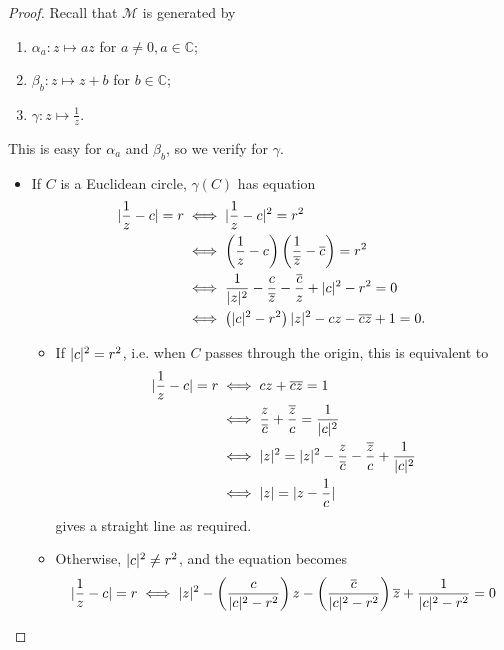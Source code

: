 \documentclass{article}
\theoremstyle{definition}
\theoremstyle{remark}
\DeclarePairedDelimiter{\abs}{\lvert}{\rvert}
\newcommand{\pqty}[1]{\left(#1\right)}
\newcommand{\functionmap}[3]{#1:#2\mapsto #3}
\newcommand{\conjugate}[1]{\overline{#1}}
\newcommand{\CC}{\mathbb{C}}
\newcommand{\mobius}{\mathcal{M}}
\begin{document}
\begin{proof}
    Recall that \(\mobius\) is generated by
    \begin{enumerate}
        \item \(\functionmap{\alpha_{a}}{z}{az}\) for \(a \neq 0, a \in \CC\);
        \item \(\functionmap{\beta_{b}}{z}{z + b}\) for \(b \in \CC\);
        \item \(\functionmap{\gamma}{z}{\frac{1}{z}}\).
    \end{enumerate}

    This is easy for \(\alpha_a\) and \(\beta_b\), so we verify for \(\gamma\).
    \begin{itemize}
        \item If \(C\) is a Euclidean circle, \(\gamma\pqty{C}\) has equation
        \begin{align*}
            \abs{\frac{1}{z} - c} = r &\iff \abs{\frac{1}{z} - c}^2 = r^2 \\
            &\iff \pqty{\frac{1}{z} - c} \pqty{\frac{1}{\conjugate{z}} - \conjugate{c}} = r^2 \\
            &\iff \frac{1}{\abs{z}^2} - \frac{c}{\conjugate{z}} - \frac{\conjugate{c}}{z} + \abs{c}^2 - r^2 = 0 \\
            &\iff \pqty{\abs{c}^2 - r^2} \abs{z}^2 - cz - \conjugate{c} \conjugate{z} + 1 = 0.
        \end{align*}
        \begin{itemize}
            \item If \(\abs{c}^2 = r^2\), i.e. when \(C\) passes through the origin, this is equivalent to
            \begin{align*}
                \abs{\frac{1}{z} - c} = r &\iff cz + \conjugate{c} \conjugate{z} = 1 \\
                &\iff \frac{z}{\conjugate{c}} + \frac{\conjugate{z}}{c} = \frac{1}{\abs{c}^2} \\
                &\iff \abs{z}^2 = \abs{z}^2 - \frac{z}{\conjugate{c}} - \frac{\conjugate{z}}{c} + \frac{1}{\abs{c}^2} \\
                &\iff \abs{z} = \abs{z - \frac{1}{c}}
            \end{align*}
            gives a straight line as required.
            \item Otherwise, \(\abs{c}^2 \neq r^2\), and the equation becomes
            \begin{align*}
                \abs{\frac{1}{z} - c} = r &\iff \abs{z}^2 - \pqty{\frac{c}{\abs{c}^2 - r^2}} z - \pqty{\frac{\conjugate{c}}{\abs{c}^2 - r^2}} \conjugate{z} + \frac{1}{\abs{c}^2 - r^2} = 0 \\

\end{align*}
\end{itemize}
\end{itemize}
\end{proof}
\end{document}
